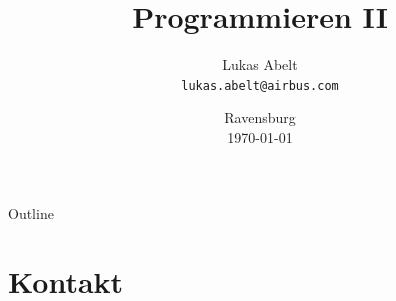 \documentclass[	12pt, 				
				t,					
				aspectratio=169,
				]{beamer}
\title{Programmieren II}
\date{Ravensburg\\\today}
\author{Lukas Abelt \\\texttt{lukas.abelt@airbus.com}}
\institute{DHBW Ravensburg \\ Wirtschaftsinformatik}
\begin{document}
	
	\begin{frame}[noframenumbering]
		\titlepage
	\end{frame}


	\begin{frame}{Outline}
		\tableofcontents
	\end{frame}
	
	\section*{Kontakt}
	
	
\end{document}
